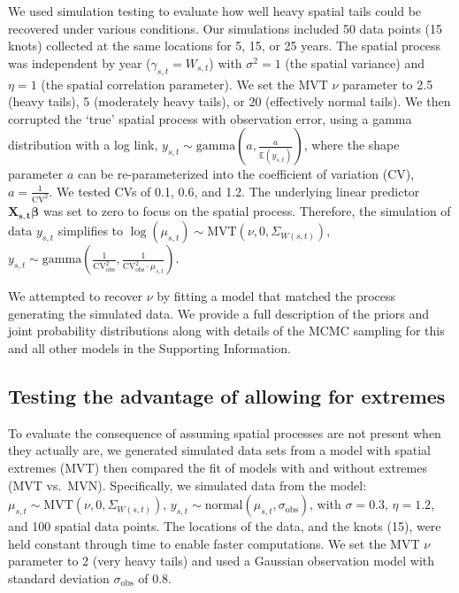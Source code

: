 \documentclass[12pt,english]{article}
\begin{document}
\begin{spacing}{1.9}
We used simulation testing to evaluate how well heavy spatial tails could be
recovered under various conditions. Our simulations included 50 data points (15
knots) collected at the same locations for 5, 15, or 25 years. The spatial
process was independent by year ($\gamma_{s,t} = W_{s,t}$) with $\sigma^2 = 1$
(the spatial variance) and $\eta = 1$ (the spatial correlation parameter).
We set the MVT $\nu$ parameter to 2.5 (heavy tails), 5 (moderately heavy tails),
or 20 (effectively normal tails). We then corrupted the `true' spatial process
with observation error, using a gamma distribution with a log link, $y_{s,t}\sim
\mathrm{gamma}\left(a,\frac {a}{\mathbb{E}(y_{s,t})} \right)$, where the shape
parameter $a$ can be re-parameterized into the coefficient of variation (CV),
$a=\frac{1}{\mathrm{CV}^2}$. We tested CVs of 0.1, 0.6, and 1.2. The underlying
linear predictor $\bm{X_{s,t}} \bm{\beta}$ was set to zero to focus on the
spatial process. Therefore, the simulation of data $y_{s,t}$ simplifies to
  $\log(\mu_{s,t}) \sim \mathrm{MVT}\left(\nu, 0, \Sigma_{W(s,t)}\right),$
  $y_{s,t} \sim \mathrm{gamma} \left( \frac{1}{\mathrm{CV}_\mathrm{obs}^2},
    \frac{1}{\mathrm{CV}_\mathrm{obs}^2 \cdot \mu_{s,t} } \right)$.

We attempted to recover $\nu$ by fitting a model that matched the process
generating the simulated data. We provide a full description of the priors
and joint probability distributions along with details of the MCMC
sampling for this and all other models in the Supporting Information.

\subsection{Testing the advantage of allowing for extremes}
\label{sec:diagnosing}

To evaluate the consequence of assuming spatial processes are not present when
they actually are, we generated simulated data sets from a model with spatial
extremes (MVT) then compared the fit of models with and without extremes (MVT
vs.\ MVN). Specifically, we simulated data from the model:
$\mu_{s,t} \sim \mathrm{MVT}\left(\nu, 0, \Sigma_{W(s,t)}\right)$,
$y_{s,t} \sim \mathrm{normal} \left(\mu_{s,t},
  \sigma_{\mathrm{obs}} \right)$,
with $\sigma = 0.3$, $\eta = 1.2$, and 100 spatial data points. The locations of
the data, and the knots (15), were held constant through time to enable faster
computations. We set the MVT $\nu$ parameter to 2 (very heavy tails) and used
a Gaussian observation model with standard deviation $\sigma_{\mathrm{obs}}$ of
0.8.


\end{spacing}
\end{document}
